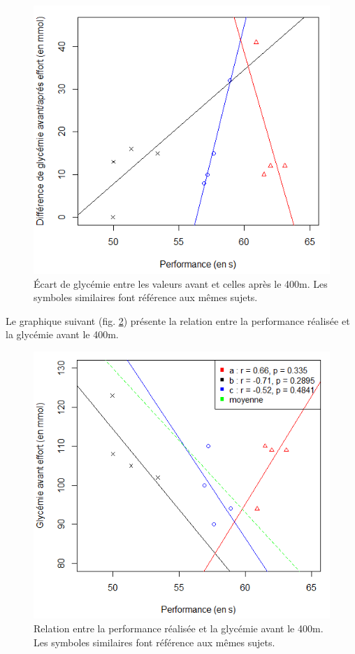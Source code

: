             \begin{figure}[H]
                \centering
                \includegraphics[scale=0.7]{images/gly_ecart}
                \caption{\label{fig:gly_ecart}Écart de glycémie entre les valeurs avant et celles après le 400m. Les symboles similaires font référence aux mêmes sujets.}
            \end{figure}
            
            
            Le graphique suivant (fig. \ref{fig:gly_perf_av}) présente la relation entre la performance réalisée et la glycémie avant le 400m.\\
            
            \begin{figure}[H]
                \centering
                \includegraphics[scale=0.7]{images/gly_perf_av_moy}
                \caption{\label{fig:gly_perf_av}Relation entre la performance réalisée et la glycémie avant le 400m. Les symboles similaires font référence aux mêmes sujets.}
            \end{figure}
            
